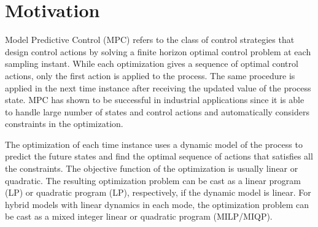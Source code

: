 \section{Motivation}

Model Predictive Control (MPC) refers to the class of control strategies that design control actions by solving a finite horizon optimal control problem at each sampling instant. While each optimization gives a sequence of optimal control actions, only the first action is applied to the process. The same procedure is applied in the next time instance after receiving the updated value of the process state. MPC has shown to be successful in industrial applications since it is able to handle large number of states and control actions and automatically considers constraints in the optimization.

The optimization of each time instance uses a dynamic model of the process to predict the future states and find the optimal sequence of actions that satisfies all the constraints. The objective function of the optimization is usually linear or quadratic. The resulting optimization problem can be cast as a linear program (LP) or quadratic program (LP), respectively, if the dynamic model is linear. For hybrid models with linear dynamics in each mode, the optimization problem can be cast as a mixed integer linear or quadratic program (MILP/MIQP). 

